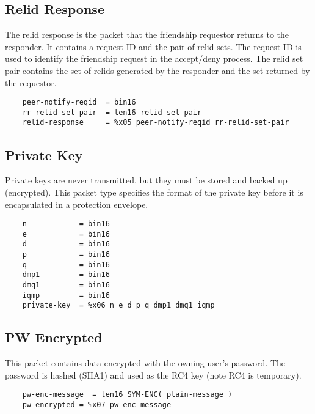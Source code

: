 \documentclass[letterpaper,11pt,oneside]{article}
\begin{document}
\subsection{Relid Response}

The relid response is the packet that the friendship requestor returns to the
responder. It contains a request ID and the pair of relid sets. The request ID
is used to identify the friendship request in the accept/deny process. The
relid set pair contains the set of relids generated by the responder and the
set returned by the requestor.

\vspace{10pt}
\begin{verbatim}
    peer-notify-reqid  = bin16
    rr-relid-set-pair  = len16 relid-set-pair
    relid-response     = %x05 peer-notify-reqid rr-relid-set-pair
\end{verbatim}
\vspace{10pt}

\subsection{Private Key}

Private keys are never transmitted, but they must be stored and backed up
(encrypted). This packet type specifies the format of the private key before it
is encapsulated in a protection envelope.

\vspace{10pt}
\begin{verbatim}
    n            = bin16
    e            = bin16
    d            = bin16
    p            = bin16
    q            = bin16
    dmp1         = bin16
    dmq1         = bin16
    iqmp         = bin16
    private-key  = %x06 n e d p q dmp1 dmq1 iqmp
\end{verbatim}
\vspace{10pt}

\subsection{PW Encrypted}

This packet contains data encrypted with the owning user's password. The
password is hashed (SHA1) and used as the RC4 key (note RC4 is temporary).

\vspace{10pt}
\begin{verbatim}
    pw-enc-message  = len16 SYM-ENC( plain-message ) 
    pw-encrypted = %x07 pw-enc-message
\end{verbatim}
\vspace{10pt}
\end{document}
